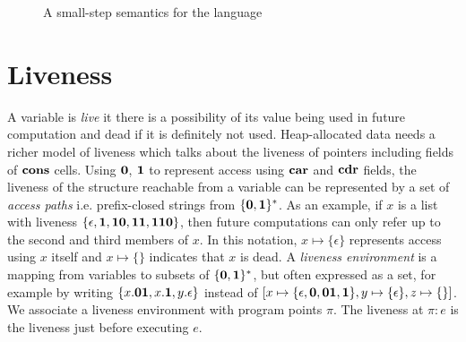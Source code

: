 \documentclass[10pt]{sigplanconf}
\begin{document}
\begin{figure*}[t!]
\begin{center}
\caption{A small-step semantics for the language}\label{fig:lang-semantics}
\end{center}
\end{figure*}


\renewcommand{\pp}[2]{\ensuremath{#1\!\!:\!#2}} %

\pagebreak

\section{Liveness}\label{sec:liveness}

A variable is {\em live} it  there is a possibility of its value being
used  in future computation  and dead  if it  is definitely  not used.
Heap-allocated data needs a richer model of liveness which talks about
the  liveness of pointers  including fields  of $\mbox{$\mathbf{cons}$}$  cells.  Using
$\mathbf{0}$, $\mathbf{1}$  to represent access using $\mbox{$\mathbf{car}$}$  and $\mbox{$\mathbf{cdr}$}$ fields,
the  liveness  of the  structure  reachable  from  a variable  can  be
represented by a set of {\em access paths} i.e.  prefix-closed strings
from $\{\mathbf{0},\mathbf{1}\}^\ast$.   As an  example, if $x$  is a  list with
liveness      $\{\epsilon,     \mathbf{1},      \mathbf{1}\mathbf{0},     \mathbf{1}\mathbf{1},
\mathbf{1}\mathbf{1}\mathbf{0}\}$, then future computations  can only refer up to the
second  and  third  members  of  $x$. In  this  notation,  $x  \mapsto
\{\epsilon\}$ represents access using  $x$ itself and $x \mapsto \{\}$
indicates that $x$ is dead.  A {\em liveness environment} is a mapping
from  variables  to   subsets  of  $\{\mathbf{0},\mathbf{1}\}^\ast$,  but  often
expressed as  a set, for example by  writing $\{x.\mathbf{0}\mathbf{1}, x.\mathbf{1},
y.\epsilon\}$               instead               of               $[x
  \mapsto\{\epsilon,\mathbf{0},\mathbf{0}\mathbf{1},\mathbf{1}\},     y\mapsto\{\epsilon\},
  z\mapsto\{\}]$.   We  associate  a  liveness environment  with  
program  points $\pi$.  The liveness  at $\pi:e$  is the  liveness just
before executing $e$.
\end{document}
